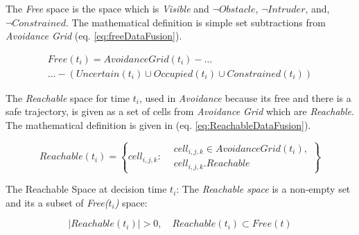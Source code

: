 \noindent The \emph{Free} space is the space which is \emph{Visible} and $\neg Obstacle$,  $\neg Intruder$, and, $\neg Constrained$. The mathematical definition is simple set subtractions from \emph{Avoidance Grid} (eq. \ref{eq:freeDataFusion}).

\begin{multline}\label{eq:freeDataFusion}
    Free(t_i) = AvoidanceGrid(t_i) -\dots\\\dots -\left(Uncertain(t_i)\cup Occupied(t_i)\cup  Constrained(t_i)\right)
\end{multline}

\noindent The \emph{Reachable} space for time $t_i$, used in \emph{Avoidance} because its free and there is a safe trajectory, is given as a set of cells from \emph{Avoidance Grid} which are \emph{Reachable}. The mathematical definition is given in (eq. \ref{eq:ReachableDataFusion}).

\begin{equation}\label{eq:ReachableDataFusion}
    Reachable(t_i) = \left\{cell_{i,j,k}:\begin{aligned}&cell_{i,j,k}\in AvoidanceGrid(t_i),\\&cell_{i,j,k}.Reachable\end{aligned}\right\}
\end{equation}

\begin{note}{The Reachable Space at decision time $t_i$:} 
The \emph{Reachable space} is a non-empty set and its a subset of \emph{Free($t_i$)} space:    

\begin{equation}\label{eq:reachableDataFusionConstraints}
    |Reachable(t_i)| > 0, \quad Reachable(t_i) \subset Free(t)
\end{equation}
\end{note}
